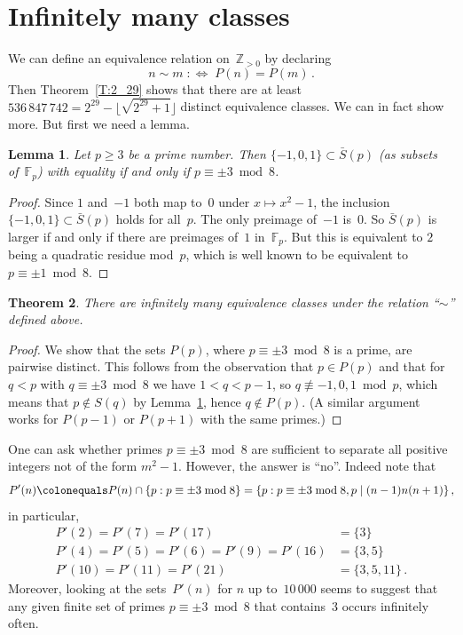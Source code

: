 \documentclass[12pt,a4paper]{amsart}
\newcommand{\Z}{{\mathbb Z}}
\newcommand{\F}{{\mathbb F}}
\newtheorem{Theorem}{Theorem}[section]
\newtheorem{Lemma}[Theorem]{Lemma}
\theoremstyle{definition}
\numberwithin{equation}{section}
\begin{document}

\section{Infinitely many classes} \label{S:infinite}

We can define an equivalence relation on~$\Z_{>0}$ by declaring
\[ n \sim m \mathrel{\;{:}{\Longleftrightarrow}\;} P(n) = P(m) \,. \]
Then Theorem~\ref{T:2_29} shows that there are at least
$536\,847\,742 = 2^{29} - \lfloor\sqrt{2^{29} + 1}\rfloor$
distinct equivalence classes. We can in fact show more. But first we need a lemma.

\begin{Lemma} \label{L:Smin}
  Let $p \geqslant 3$ be a prime number. Then $\{-1,0,1\} \subset \bar{S}(p)$
  (as subsets of~$\F_p$) with equality if and only if $p \equiv \pm 3 \bmod 8$.
\end{Lemma}

\begin{proof}
  Since $1$ and~$-1$ both map to~$0$ under $x \mapsto x^2 - 1$, the inclusion
  $\{-1,0,1\} \subset \bar{S}(p)$ holds for all~$p$.
  The only preimage of~$-1$ is~$0$. So $\bar{S}(p)$ is larger if and only if
  there are preimages of~$1$ in~$\F_p$. But this is equivalent to $2$ being a quadratic
  residue mod~$p$, which is well known to be equivalent to $p \equiv \pm 1 \bmod 8$.
\end{proof}

\begin{Theorem}
  There are infinitely many equivalence classes under the relation ``$\sim$'' defined above.
\end{Theorem}

\begin{proof}
  We show that the sets $P(p)$, where $p \equiv \pm 3 \bmod 8$ is a prime, are pairwise distinct.
  This follows from the observation that $p \in P(p)$ and that for $q < p$ with $q \equiv \pm 3 \bmod 8$ we have
  $1 < q < p - 1$, so $q \not\equiv -1, 0, 1 \bmod p$, which means that $p \notin S(q)$
  by Lemma~\ref{L:Smin}, hence $q \notin P(p)$.
  (A similar argument works for $P(p-1)$  or $P(p+1)$ with the same primes.)
\end{proof}

One can ask whether primes $p \equiv \pm 3 \bmod 8$ are sufficient to separate
all positive integers not of the form $m^2 - 1$. However, the answer is ``no''. Indeed note that
\[ P'(n) \colonequals P(n) \cap \{p : p \equiv \pm 3 \bmod 8\} = \{p : p \equiv \pm 3 \bmod 8, p \mid (n-1) n (n+1)\} \,, \]
in particular,
\begin{align*}
   P'(2) = P'(7) = P'(17) &= \{3\} \\
   P'(4) = P'(5) = P'(6) = P'(9) = P'(16) &= \{3, 5\} \\
   P'(10) = P'(11) = P'(21) &= \{3, 5, 11\} \,.
\end{align*}
Moreover, looking at the sets~$P'(n)$ for $n$ up to~$10\,000$
seems to suggest that any given finite set of primes $p \equiv \pm 3 \bmod 8$
that contains~$3$ occurs infinitely often.
\end{document}
